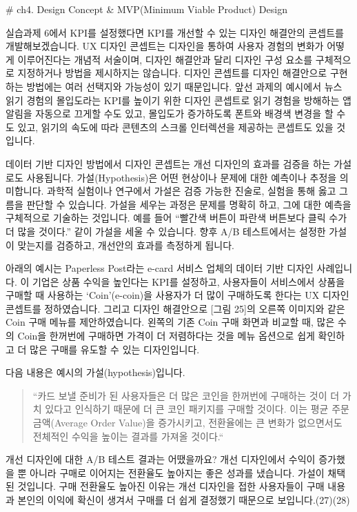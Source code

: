 \documentclass[
  letterpaper,
]{book}
\begin{document}
\# ch4. Design Concept \& MVP(Minimum Viable Product) Design

실습과제 6에서 KPI를 설정했다면 KPI를 개선할 수 있는 디자인 해결안의
콘셉트를 개발해보겠습니다. UX 디자인 콘셉트는 디자인을 통하여 사용자
경험의 변화가 어떻게 이루어진다는 개념적 서술이며, 디자인 해결안과 달리
디자인 구성 요소를 구체적으로 지정하거나 방법을 제시하지는 않습니다.
디자인 콘셉트를 디자인 해결안으로 구현하는 방법에는 여러 선택지와
가능성이 있기 때문입니다. 앞선 과제의 예시에서 뉴스 읽기 경험의
몰입도라는 KPI를 높이기 위한 디자인 콘셉트로 읽기 경험을 방해하는 앱
알림을 자동으로 끄게할 수도 있고, 몰입도가 증가하도록 폰트와 배경색
변경을 할 수 도 있고, 읽기의 속도에 따라 콘텐츠의 스크롤 인터렉션을
제공하는 콘셉트도 있을 것입니다.

데이터 기반 디자인 방법에서 디자인 콘셉트는 개선 디자인의 효과를 검증을
하는 가설로도 사용됩니다. 가설(Hypothesis)은 어떤 현상이나 문제에 대한
예측이나 추정을 의미합니다. 과학적 실험이나 연구에서 가설은 검증 가능한
진술로, 실험을 통해 옳고 그름을 판단할 수 있습니다. 가설을 세우는 과정은
문제를 명확히 하고, 그에 대한 예측을 구체적으로 기술하는 것입니다. 예를
들어 ``빨간색 버튼이 파란색 버튼보다 클릭 수가 더 많을 것이다.'' 같이
가설을 세울 수 있습니다. 향후 A/B 테스트에서는 설정한 가설이 맞는지를
검증하고, 개선안의 효과를 측정하게 됩니다.

아래의 예시는 Paperless Post라는 e-card 서비스 업체의 데이터 기반 디자인
사례입니다. 이 기업은 상품 수익을 높인다는 KPI를 설정하고, 사용자들이
서비스에서 상품을 구매할 때 사용하는 `Coin'(e-coin)을 사용자가 더 많이
구매하도록 한다는 UX 디자인 콘셉트를 정하였습니다. 그리고 디자인
해결안으로 {[}그림 25{]}의 오른쪽 이미지와 같은 Coin 구매 메뉴를
제안하였습니다. 왼쪽의 기존 Coin 구매 화면과 비교할 때, 많은 수의 Coin을
한꺼번에 구매하면 가격이 더 저렴하다는 것을 메뉴 옵션으로 쉽게 확인하고
더 많은 구매를 유도할 수 있는 디자인입니다.

다음 내용은 예시의 가설(hypothesis)입니다.

\begin{quote}
``카드 보낼 준비가 된 사용자들은 더 많은 코인을 한꺼번에 구매하는 것이
더 가치 있다고 인식하기 때문에 더 큰 코인 패키지를 구매할 것이다. 이는
평균 주문 금액(Average Order Value)을 증가시키고, 전환율에는 큰 변화가
없으면서도 전체적인 수익을 높이는 결과를 가져올 것이다.``
\end{quote}

개선 디자인에 대한 A/B 테스트 결과는 어땠을까요? 개선 디자인에서 수익이
증가했을 뿐 아니라 구매로 이어지는 전환율도 높아지는 좋은 성과를
냈습니다. 가설이 채택된 것입니다. 구매 전환율도 높아진 이유는 개선
디자인을 접한 사용자들이 구매 내용과 본인의 이익에 확신이 생겨서 구매를
더 쉽게 결정했기 때문으로 보입니다.(27)(28)
\end{document}
